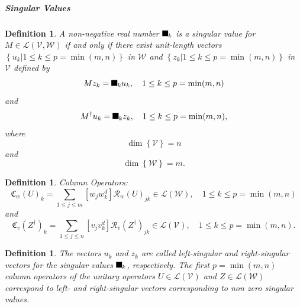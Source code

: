 \documentclass[aps,preprint]{revtex4}%
\providecommand{\U}[1]{\protect\rule{.1in}{.1in}}
\newtheorem{definition}[theorem]{Definition}
\begin{document}
\subparagraph{Singular Values}

\begin{definition}
A \emph{non-negative} real number $\U{3c3} _{k}$ is a \emph{singular value}
for $M\in\mathcal{L}\left(  \mathcal{V},\mathcal{W}\right)  $ \emph{if and
only if} there exist unit-length vectors $\left\{  \left.  u_{k}\right\vert
1\leq k\leq p=\min(m,n)\right\}  $ in $\mathcal{W}$ and $\left\{  \left.
z_{k}\right\vert 1\leq k\leq p=\min(m,n)\right\}  $ in $\mathcal{V}$ defined
by
\begin{equation}
Mz_{k}=\U{3c3} _{k}u_{k},\quad1\leq k\leq p=\min(m,n)
\end{equation}
and
\begin{equation}
M^{\dagger}u_{k}=\U{3c3} _{k}z_{k},\quad1\leq k\leq p=\min(m,n),
\end{equation}
where
\begin{equation}
\dim\left\{  \mathcal{V}\right\}  =n
\end{equation}
and
\begin{equation}
\dim\left\{  \mathcal{W}\right\}  =m.
\end{equation}

\end{definition}

\begin{definition}
\emph{Column Operators}:
\begin{equation}
\mathfrak{C}_{w}\left(  U\right)  _{k}=\sum_{1\leq j\leq m}\left[  w_{j}%
w_{k}^{d}\right]  \mathcal{R}_{w}\left(  U\right)  _{jk}\in\mathcal{L}\left(
\mathcal{W}\right)  ,\quad1\leq k\leq p=\min(m,n)
\end{equation}
and%
\begin{equation}
\mathfrak{C}_{v}\left(  Z^{\dagger}\right)  _{k}=\sum_{1\leq j\leq n}\left[
v_{j}v_{k}^{d}\right]  \mathcal{R}_{v}\left(  Z^{\dagger}\right)  _{jk}%
\in\mathcal{L}\left(  \mathcal{V}\right)  ,\quad1\leq k\leq p=\min(m,n).
\end{equation}

\end{definition}

\begin{definition}
The vectors $u_{k}$ and $z_{k}$ are called \emph{left-singular} and
\emph{right-singular} vectors for the singular values $\U{3c3} _{k}$,
respectively. The first $p=\min(m,n)$ \emph{column operators} of the unitary
operators $U\in\mathcal{L}\left(  \mathcal{V}\right)  $ and $Z\in
\mathcal{L}\left(  \mathcal{W}\right)  $ correspond to \emph{left- and
right-singular vectors corresponding to non zero singular values}.
\end{definition}
\end{document}
